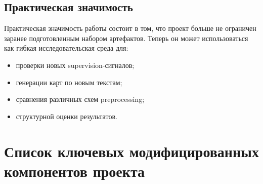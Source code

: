 \documentclass[12pt,a4paper]{article}
\begin{document}
\subsection{Практическая значимость}

Практическая значимость работы состоит в том, что проект больше не ограничен заранее
подготовленным набором артефактов. Теперь он может использоваться как гибкая
исследовательская среда для:

\begin{itemize}
    \item проверки новых supervision-сигналов;
    \item генерации карт по новым текстам;
    \item сравнения различных схем preprocessing;
    \item структурной оценки результатов.
\end{itemize}

\section{Список ключевых модифицированных компонентов проекта}
\end{document}
